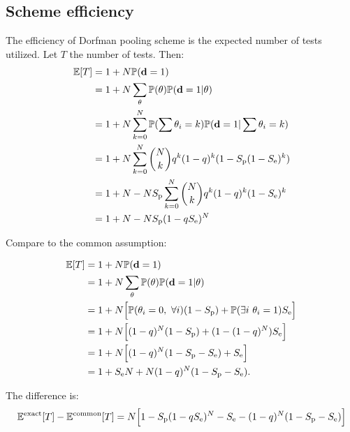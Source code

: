 \documentclass{article}
\begin{document}
\subsection{Scheme efficiency}
The efficiency of Dorfman pooling scheme is the expected number of
tests utilized. Let $T$ the number of tests. Then:
\begin{align}
  \begin{split}
    \mathbb{E}[T] &= 1 + N\mathbb{P}(\mathbf{d}=1)\\
    &= 1 + N\sum_{\theta} \mathbb{P}(\theta) \mathbb{P}(\mathbf{d}=1|\theta) \\
    &= 1 + N\sum_{k=0}^N \mathbb{P}(\sum \theta_i = k) \mathbb{P}(\mathbf{d}=1|\sum \theta_i = k) \\
    &= 1 + N\sum_{k=0}^N \binom{N}{k}q^k(1-q)^k (1-S_\text{p}(1-S_\text{e})^k) \\
    &= 1+N - NS_\text{p}\sum_{k=0}^N \binom{N}{k}q^k(1-q)^k (1-S_\text{e})^k \\
    &= 1+N - NS_\text{p} (1-qS_\text{e})^N\\    
  \end{split}
\end{align}

Compare to the common assumption:

\begin{align}
  \begin{split}
    \mathbb{E}[T] &= 1 + N\mathbb{P}(\mathbf{d}=1)\\
    &= 1 + N\sum_{\theta} \mathbb{P}(\theta) \mathbb{P}(\mathbf{d}=1|\theta) \\
    &= 1 + N\Big[\mathbb{P}(\theta_i = 0,\ \forall i)(1-S_\text{p}) + \mathbb{P}(\exists i\ \theta_i =1)S_\text{e}\Big] \\
    &= 1 + N\Big [(1-q)^N(1-S_\text{p}) + (1-(1-q)^N)S_\text{e} \Big ] \\
    &= 1 + N\Big [(1-q)^N(1-S_\text{p} - S_\text{e}) + S_\text{e} \Big ] \\
    &= 1 + S_\text{e} N + N(1-q)^N(1-S_\text{p} - S_\text{e}).
  \end{split}
\end{align}

The difference is:
\begin{equation}
  \mathbb{E}^{\text{exact}}[T] - \mathbb{E}^{\text{common}}[T] = N \Big [1 - S_\text{p}(1-qS_\text{e})^N - S_\text{e} - (1-q)^N(1-S_\text{p} - S_\text{e}) \Big ]
\end{equation}
\end{document}
